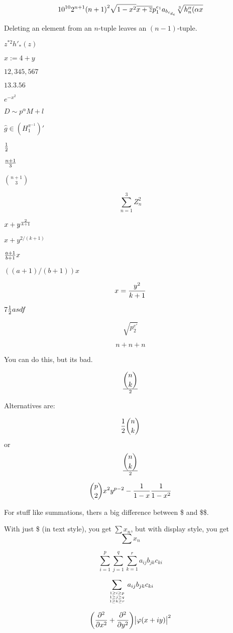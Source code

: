 $$10^{10}
2^{n+1}
{(n+1)}^2
\sqrt{1-x^2}
\overline{x+\overline{z}}
p{}^{e_1}_1
a_{b_{c_{d_e}}}
\root 3 \of {h''_n(\alpha{}x}
$$


Deleting an element from an $n$-tuple leaves an $(n-1)$-tuple.


$
z^{*{}2}
h'_*(z)
$

$x := 4+y$

$12{,}345,567$

$13{.}3.56$

$e^{-x^2}$

$D \sim p^{\alpha}M + l$

$\hat{g}{\in}(H^{{\pi}^{-1}}_1)'$

$1\over{2}$

$n+1\over{3}$

$n+1\choose{3}$

$$\sum_{n=1}^3{} Z_n^2$$

$x + y^{2\over{k+1}}$

$x + y^{2/(k+1)}$

${a+1\over{b+1}}x$

$((a+1)/(b+1))x$

$$x = {y^2\over k+1}$$

$7{1\over2}asdf$

$$\sqrt{p^{e'}_2}$$

$$n +\scriptstyle{n} + \scriptscriptstyle{n}$$

You can do this, but its bad.

$${n\choose{k}}\over{2}$$

Alternatives are:

$${1\over{2}}{n\choose{k}}$$
or
$${\displaystyle{n\choose{k}}}\over{2}$$

$${p\choose{2}} x^2 y^{p-2} - {1\over{1-x}} {1\over{1-x^2}}$$


For stuff like summations, thers a big difference between \$ and \$\$.

With just \$ (in text style), you get $\sum{x_n}$, but with display style, you get $$\sum{x_n}$$
%

 $$\sum^p_{i=1}{\sum^q_{j=1}{\sum^r_{k=1}}
 {a_{ij}b_{jk}c_{ki}}}$$

$$\sum_{{1\ge{}i\ge{}p}\atop{{1\ge{}j\ge{}q}\atop{{1\ge{}k\ge{}r}}}}{a_{ij}b_{jk}c_{ki}}$$


$$
\biggl{(} {\partial{}^2\over{\partial{}x^2}} + {\partial{}^2\over{\partial{}y^2}}\biggl{)}
{\bigl|\varphi(x + iy)\bigl|}^2
$$

